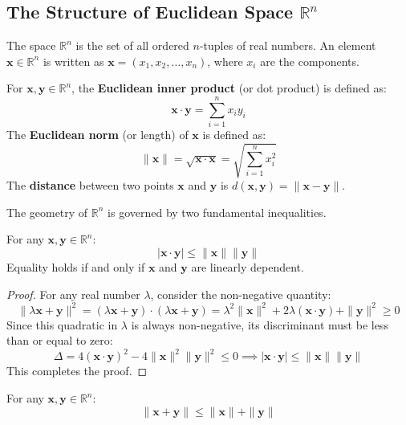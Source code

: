 \subsection{The Structure of Euclidean Space $\mathbb{R}^n$}

The space $\mathbb{R}^n$ is the set of all ordered $n$-tuples of real numbers. An element $\mathbf{x} \in \mathbb{R}^n$ is written as $\mathbf{x} = (x_1, x_2, \dots, x_n)$, where $x_i$ are the components.

\begin{definition}
For $\mathbf{x}, \mathbf{y} \in \mathbb{R}^n$, the \textbf{Euclidean inner product} (or dot product) is defined as:
\[ \mathbf{x} \cdot \mathbf{y} = \sum_{i=1}^n x_i y_i \]
The \textbf{Euclidean norm} (or length) of $\mathbf{x}$ is defined as:
\[ \|\mathbf{x}\| = \sqrt{\mathbf{x} \cdot \mathbf{x}} = \sqrt{\sum_{i=1}^n x_i^2} \]
The \textbf{distance} between two points $\mathbf{x}$ and $\mathbf{y}$ is $d(\mathbf{x}, \mathbf{y}) = \|\mathbf{x} - \mathbf{y}\|$.
\end{definition}

The geometry of $\mathbb{R}^n$ is governed by two fundamental inequalities.

\begin{theorem}
For any $\mathbf{x}, \mathbf{y} \in \mathbb{R}^n$:
\[ |\mathbf{x} \cdot \mathbf{y}| \le \|\mathbf{x}\| \|\mathbf{y}\| \]
Equality holds if and only if $\mathbf{x}$ and $\mathbf{y}$ are linearly dependent.
\end{theorem}

\begin{proof}
For any real number $\lambda$, consider the non-negative quantity:
\[ \|\lambda \mathbf{x} + \mathbf{y}\|^2 = (\lambda \mathbf{x} + \mathbf{y}) \cdot (\lambda \mathbf{x} + \mathbf{y}) = \lambda^2 \|\mathbf{x}\|^2 + 2\lambda (\mathbf{x} \cdot \mathbf{y}) + \|\mathbf{y}\|^2 \ge 0 \]
Since this quadratic in $\lambda$ is always non-negative, its discriminant must be less than or equal to zero:
\[ \Delta = 4(\mathbf{x} \cdot \mathbf{y})^2 - 4\|\mathbf{x}\|^2 \|\mathbf{y}\|^2 \le 0 \implies |\mathbf{x} \cdot \mathbf{y}| \le \|\mathbf{x}\| \|\mathbf{y}\| \]
This completes the proof.
\end{proof}

\begin{theorem}
For any $\mathbf{x}, \mathbf{y} \in \mathbb{R}^n$:
\[ \|\mathbf{x} + \mathbf{y}\| \le \|\mathbf{x}\| + \|\mathbf{y}\| \]
\end{theorem}


